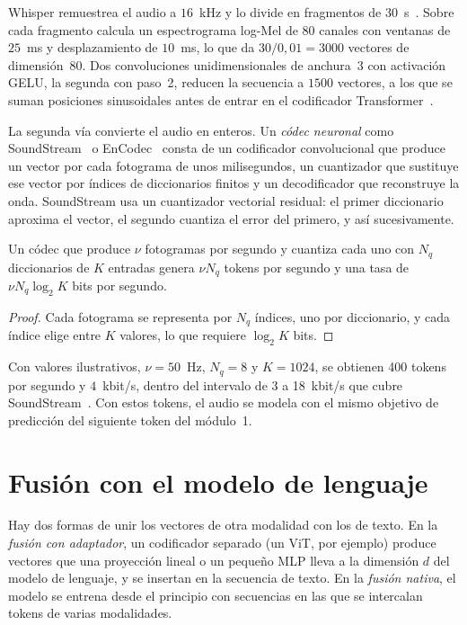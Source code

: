 \begin{ejemplo}\label{ej:whisper}
Whisper remuestrea el audio a $16$~kHz y lo divide en fragmentos de $30$~s~\cite[§2.1]{whisper}. Sobre cada fragmento calcula un espectrograma log-Mel de 80 canales con ventanas de $25$~ms y desplazamiento de $10$~ms, lo que da $30/0{,}01=3000$ vectores de dimensión~80. Dos convoluciones unidimensionales de anchura~3 con activación GELU, la segunda con paso~2, reducen la secuencia a $1500$ vectores, a los que se suman posiciones sinusoidales antes de entrar en el codificador Transformer~\cite[§2.2]{whisper}.
\end{ejemplo}

La segunda vía convierte el audio en enteros. Un \emph{códec neuronal} como SoundStream~\cite{soundstream} o EnCodec~\cite{encodec} consta de un codificador convolucional que produce un vector por cada fotograma de unos milisegundos, un cuantizador que sustituye ese vector por índices de diccionarios finitos y un decodificador que reconstruye la onda. SoundStream usa un cuantizador vectorial residual: el primer diccionario aproxima el vector, el segundo cuantiza el error del primero, y así sucesivamente.

\begin{proposicion}\label{prop:rvq}
Un códec que produce $\nu$ fotogramas por segundo y cuantiza cada uno con $N_q$ diccionarios de $K$ entradas genera $\nu N_q$ tokens por segundo y una tasa de $\nu N_q\log_2K$ bits por segundo.
\end{proposicion}

\begin{proof}
Cada fotograma se representa por $N_q$ índices, uno por diccionario, y cada índice elige entre $K$ valores, lo que requiere $\log_2K$ bits.
\end{proof}

Con valores ilustrativos, $\nu=50$~Hz, $N_q=8$ y $K=1024$, se obtienen 400 tokens por segundo y $4$~kbit/s, dentro del intervalo de 3 a 18~kbit/s que cubre SoundStream~\cite{soundstream}. Con estos tokens, el audio se modela con el mismo objetivo de predicción del siguiente token del módulo~1.

\section{Fusión con el modelo de lenguaje}

Hay dos formas de unir los vectores de otra modalidad con los de texto. En la \emph{fusión con adaptador}, un codificador separado (un ViT, por ejemplo) produce vectores que una proyección lineal o un pequeño MLP lleva a la dimensión $d$ del modelo de lenguaje, y se insertan en la secuencia de texto. En la \emph{fusión nativa}, el modelo se entrena desde el principio con secuencias en las que se intercalan tokens de varias modalidades.

